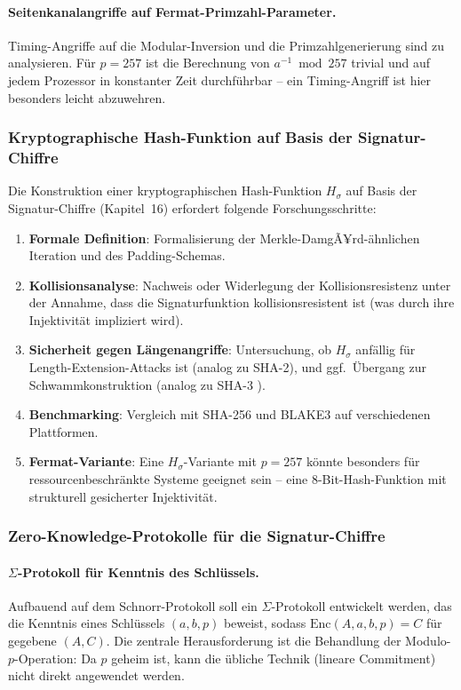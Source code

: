 ﻿\documentclass[a4paper,12pt]{scrreprt}
\theoremstyle{definition}
\begin{document}
\paragraph{Seitenkanalangriffe auf Fermat-Primzahl-Parameter.}
Timing-Angriffe \cite{Koc96} auf die Modular-Inversion und die Primzahlgenerierung sind zu analysieren. Für $p = 257$ ist die Berechnung von $a^{-1} \bmod 257$ trivial und auf jedem Prozessor in konstanter Zeit durchführbar -- ein Timing-Angriff ist hier besonders leicht abzuwehren.

\subsubsection{Kryptographische Hash-Funktion auf Basis der Signatur-Chiffre}

Die Konstruktion einer kryptographischen Hash-Funktion $H_\sigma$ auf Basis der Signatur-Chiffre (Kapitel~16) erfordert folgende Forschungsschritte:

\begin{enumerate}
    \item \textbf{Formale Definition}: Formalisierung der Merkle-DamgÃ¥rd-ähnlichen Iteration und des Padding-Schemas.
    \item \textbf{Kollisionsanalyse}: Nachweis oder Widerlegung der Kollisionsresistenz unter der Annahme, dass die Signaturfunktion kollisionsresistent ist (was durch ihre Injektivität impliziert wird).
    \item \textbf{Sicherheit gegen Längenangriffe}: Untersuchung, ob $H_\sigma$ anfällig für Length-Extension-Attacks ist (analog zu SHA-2), und ggf.\ Übergang zur Schwammkonstruktion (analog zu SHA-3 \cite{BDPA13}).
    \item \textbf{Benchmarking}: Vergleich mit SHA-256 und BLAKE3 auf verschiedenen Plattformen.
    \item \textbf{Fermat-Variante}: Eine $H_\sigma$-Variante mit $p = 257$ könnte besonders für ressourcenbeschränkte Systeme geeignet sein -- eine 8-Bit-Hash-Funktion mit strukturell gesicherter Injektivität.
\end{enumerate}

\subsubsection{Zero-Knowledge-Protokolle für die Signatur-Chiffre}

\paragraph{$\Sigma$-Protokoll für Kenntnis des Schlüssels.}
Aufbauend auf dem Schnorr-Protokoll soll ein $\Sigma$-Protokoll entwickelt werden, das die Kenntnis eines Schlüssels $(a,b,p)$ beweist, sodass $\mathrm{Enc}(A,a,b,p) = C$ für gegebene $(A,C)$. Die zentrale Herausforderung ist die Behandlung der Modulo-$p$-Operation: Da $p$ geheim ist, kann die übliche Technik (lineare Commitment) nicht direkt angewendet werden.
\end{document}
